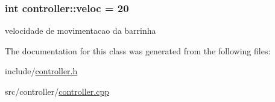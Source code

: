 \subsubsection[{\texorpdfstring{veloc}{veloc}}]{\setlength{\rightskip}{0pt plus 5cm}int controller\+::veloc = 20\hspace{0.3cm}{\ttfamily [private]}}\hypertarget{classcontroller_ae1229353be5404b8decda1e8775292c4}{}\label{classcontroller_ae1229353be5404b8decda1e8775292c4}
velocidade de movimentacao da barrinha 

The documentation for this class was generated from the following files\+:\begin{DoxyCompactItemize}
\item 
include/\hyperlink{controller_8h}{controller.\+h}\item 
src/controller/\hyperlink{controller_8cpp}{controller.\+cpp}\end{DoxyCompactItemize}
